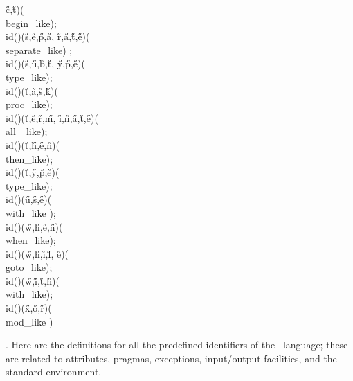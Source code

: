 \H{c}\?,\?\H{t}\?\2)\1(\?\\{begin\_like}\?\2)\?;\6
\\{id}\?\1(\?\2)\1(\?\H{s}\?,\?\H{e}\?,\?\H{p}\?,\?\H{a}\?,\?%
\H{r}\?,\?\H{a}\?,\?\H{t}\?,\?\H{e}\?\2)\1(\?\\{separate\_like}\?\2)%
\?;\6
\\{id}\?\1(\?\2)\1(\?\H{s}\?,\?\H{u}\?,\?\H{b}\?,\?\H{t}\?,\?%
\H{y}\?,\?\H{p}\?,\?\H{e}\?\2)\1(\?\\{type\_like}\?\2)\?;\6
\\{id}\?\1(\?\2)\1(\?\H{t}\?,\?\H{a}\?,\?\H{s}\?,\?\H{k}\?\2)\1(\?%
\\{proc\_like}\?\2)\?;\6
\\{id}\?\1(\?\2)\1(\?\H{t}\?,\?\H{e}\?,\?\H{r}\?,\?\H{m}\?,\?%
\H{i}\?,\?\H{n}\?,\?\H{a}\?,\?\H{t}\?,\?\H{e}\?\2)\1(\?\\{all%
\_like}\?\2)\?;\6
\\{id}\?\1(\?\2)\1(\?\H{t}\?,\?\H{h}\?,\?\H{e}\?,\?\H{n}\?\2)\1(\?%
\\{then\_like}\?\2)\?;\6
\\{id}\?\1(\?\2)\1(\?\H{t}\?,\?\H{y}\?,\?\H{p}\?,\?\H{e}\?\2)\1(\?%
\\{type\_like}\?\2)\?;\6
\\{id}\?\1(\?\2)\1(\?\H{u}\?,\?\H{s}\?,\?\H{e}\?\2)\1(\?\\{with\_like}%
\?\2)\?;\6
\\{id}\?\1(\?\2)\1(\?\H{w}\?,\?\H{h}\?,\?\H{e}\?,\?\H{n}\?\2)\1(\?%
\\{when\_like}\?\2)\?;\6
\\{id}\?\1(\?\2)\1(\?\H{w}\?,\?\H{h}\?,\?\H{i}\?,\?\H{l}\?,\?%
\H{e}\?\2)\1(\?\\{goto\_like}\?\2)\?;\6
\\{id}\?\1(\?\2)\1(\?\H{w}\?,\?\H{i}\?,\?\H{t}\?,\?\H{h}\?\2)\1(\?%
\\{with\_like}\?\2)\?;\6
\\{id}\?\1(\?\2)\1(\?\H{x}\?,\?\H{o}\?,\?\H{r}\?\2)\1(\?\\{mod\_like}%
\?\2)\?\par
\fi

. Here are the definitions for all the predefined identifiers of the
\ADA\ language; these are related to attributes, pragmas, exceptions,
input/output facilities, and the standard environment.

